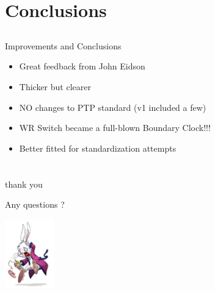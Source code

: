 \documentclass[compress,red]{beamer}
\begin{document}
\section{Conclusions}
\subsection{}
\begin{frame}{Improvements and Conclusions}

\begin{itemize}
  \item Great feedback from John Eidson
  \item Thicker but clearer
  \item NO changes to PTP standard (v1 included a few)
  \item WR Switch became a full-blown Boundary Clock!!!
  \item Better fitted for standardization attempts
\end{itemize}

\end{frame}
\section{}
\begin{frame}{thank you}

    \begin{center}
    Any questions ?
    \end{center}

    
    \begin{center}
    \includegraphics[height=3.0cm]{misc/white_rabbit_end.png}
    \end{center}

\end{frame}
\end{document}
